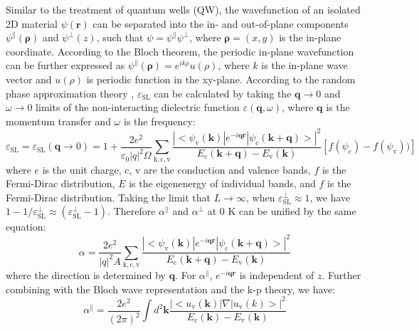 \documentclass[journal=ancac3,manuscript=article,email=true,hyperref=true,keywords=false]{achemso}
\begin{document}
Similar to the treatment of quantum wells (QW), the wavefunction of an
isolated 2D material $\psi(\mathbf{r})$ can be separated into the in-
and out-of-plane components \cite{davies_physics_1997}
$\psi^{\parallel}(\mathbf{\rho})$ and $\psi^{\perp}(z)$, such that
$\psi=\psi^{\parallel}\psi^{\perp}$, where $\mathbf{\rho}=(x, y)$ is
the in-plane coordinate. According to the Bloch theorem, the periodic
in-plane wavefunction can be further expressed as
$\psi^{\parallel}(\mathbf{\rho})=e^{ik\rho}u(\rho)$, where $k$ is the
in-plane wave vector and $u(\rho)$ is periodic function in the
xy-plane. According to the random phase approximation theory
\cite{Adler_1962}, $\varepsilon_{\mathrm{SL}}$ can be calculated by
taking the $\mathbf{q} \to 0$ and $\omega \to 0$ limits of the
non-interacting dielectric function $\varepsilon(\mathbf{q}, \omega)$,
where $\mathbf{q}$ is the momentum transfer and $\omega$ is the
frequency:
\begin{equation}
  \label{eq:RPA-eps2}
  \varepsilon_{\mathrm{SL}}
  = \varepsilon_{\mathrm{SL}}(\mathbf{q} \to 0)
  = 1 + \frac{2e^{2}}{\varepsilon_{0} |q|^{2} \Omega}
  \sum_{\mathrm{k, c, v}}
  \frac{|<\psi_{\mathrm{v}}(\mathbf{k})|e^{-i\mathbf{q}\mathbf{r}}|\psi_{\mathrm{c}}(\mathbf{k+q})>|^{2}}
  {E_{\mathrm{c}}(\mathbf{k+q}) - E_{\mathrm{v}}(\mathbf{k})}
  \left[f(\psi_{\mathrm{c}}) - f(\psi_{\mathrm{v}}))\right]
\end{equation}
where $e$ is the unit charge, c, v are the conduction and valence
bands, $f$ is the Fermi-Dirac distribution, $E$ is the eigenenergy of
individual bands, and $f$ is the Fermi-Dirac distribution. Taking the
limit that $L\to\infty$, when
$\varepsilon^{\perp}_{\mathrm{SL}} \approx 1$, we have
$1-1/\varepsilon^{\perp}_{\mathrm{SL}} \approx
(\varepsilon_{\mathrm{SL}}^{\perp} - 1)$. Therefore $\alpha^{\parallel}$ and $\alpha^{\perp}$ at 0 K can be unified by the same equation:
\begin{equation}
  \label{eq:alpha-RPA}
  \alpha = \frac{2e^{2}}{|q|^{2}A} \sum_{\mathrm{k,c,v}}
  \frac{|<\psi_{\mathrm{v}}(\mathbf{k})|e^{-i\mathbf{q}\mathbf{r}}|\psi_{\mathrm{c}}(\mathbf{k+q})>|^{2}}
  {E_{\mathrm{c}}(\mathbf{k+q}) - E_{\mathrm{v}}(\mathbf{k})}
\end{equation}
where the direction is determined by $\mathbf{q}$. For
$\alpha^{\parallel}$, $e^{-i\mathbf{qr}}$ is independent of
$z$. Further combining with the Bloch wave representation and the k-p
theory\cite{Jiang_2017_Eg_Eb}, we have:
\begin{equation}
  \label{eq:alpha_para_RPA}
  \alpha^{\parallel} = \frac{2e^{2}}
  {(2 \pi)^{2}} \int d^{2}\mathbf{k}
  \frac{|<u_{\mathrm{v}}(\mathbf{k})|\nabla|u_{\mathrm{v}}(k)>|^{2}}
  {E_{\mathrm{c}}(\mathbf{k}) - E_{\mathrm{v}}(\mathbf{k})}
\end{equation}
\end{document}
